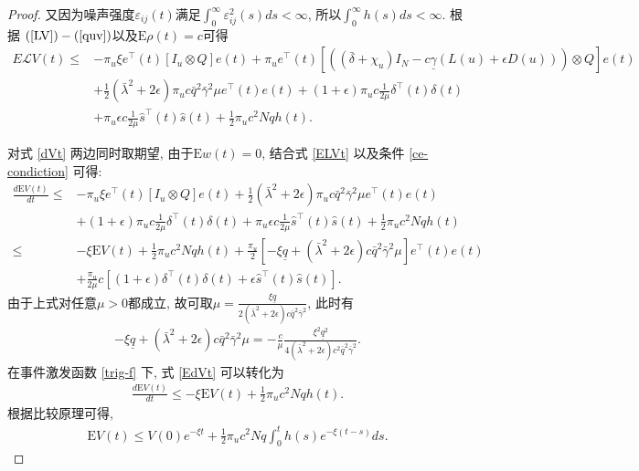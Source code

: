 \begin{proof}
        又因为噪声强度$\varepsilon_{ij}(t)$满足$\int_0^\infty\varepsilon_{ij}^2(s)ds<\infty$, 所以$\int_0^\infty h(s)ds<\infty$.
        根据 $(\ref{LV})-(\ref{quv})$以及$\mathrm{E}\rho(t)=c$可得
        \begin{align}\label{ELVt}
        \nonumber E\mathcal{L}V(t)\leq&-\pi_u\xi e^\top(t)[I_u\otimes Q]e(t)+\pi_ue^\top(t)[((\bar{\delta}+\chi_u)I_N-c\underline{\gamma}(L(u)+\epsilon D(u)))\otimes Q]e(t)\\
        \nonumber&+\frac{1}{2}(\bar{\lambda}^2+2\epsilon)\pi_uc\bar{q}^2\bar{\gamma}^2\mu e^\top(t)e(t)
        +(1+\epsilon)\pi_uc\frac{1}{2\mu}\delta^\top(t)\delta(t)\\
        &+\pi_u\epsilon c\frac{1}{2\mu}\hat{s}^\top(t)\hat{s}(t)+\frac{1}{2}\pi_uc^2Nqh(t).
        \end{align}

        对式 \eqref{dVt} 两边同时取期望, 由于$\mathrm{E}w(t)=0$, 结合式 \eqref{ELVt} 以及条件 \eqref{ce-condiction} 可得:
        \begin{align}\label{EdVt}
        \nonumber \frac{d\mathrm{E}V(t)}{dt}\leq&-\pi_u\xi e^\top(t)[I_u\otimes Q]e(t)+\frac{1}{2}(\bar{\lambda}^2+2\epsilon)\pi_uc\bar{q}^2\bar{\gamma}^2\mu e^\top(t)e(t)\\
        \nonumber&+(1+\epsilon)\pi_uc\frac{1}{2\mu}\delta^\top(t)\delta(t)+\pi_u\epsilon c\frac{1}{2\mu}\hat{s}^\top(t)\hat{s}(t)+\frac{1}{2}\pi_uc^2Nqh(t)\\
        \nonumber\leq&-\xi \mathrm{E}V(t)+\frac{1}{2}\pi_uc^2Nqh(t)+\frac{\pi_u}{2}[-\xi\underline{q}+(\bar{\lambda}^2
        +2\epsilon)c\bar{q}^2\bar{\gamma}^2\mu]e^\top(t)e(t)\\
        &+\frac{\pi_u}{2\mu}c[(1+\epsilon)\delta^\top(t)\delta(t)+\epsilon\hat{s}^\top(t)\hat{s}(t)].
        \end{align}
        由于上式对任意$\mu>0$都成立, 故可取$\mu=\frac{\xi\underline{q}}{2(\bar{\lambda}^2+2\epsilon)c\bar{q}^2\bar{\gamma}^2}$, 此时有
        \begin{align*}
        -\xi\underline{q}+(\bar{\lambda}^2+2\epsilon)c\bar{q}^2\bar{\gamma}^2\mu
        =-\frac{c}{\mu}\frac{\xi^2\underline{q}^2}{4(\bar{\lambda}^2+2\epsilon)c^2\bar{q}^2\bar{\gamma}^2}.
        \end{align*}
        在事件激发函数 \eqref{trig-f} 下, 式 \eqref{EdVt} 可以转化为
        \begin{align*}
        \frac{d\mathrm{E}V(t)}{dt}\leq-\xi \mathrm{E}V(t)+\frac{1}{2}\pi_uc^2Nqh(t).
        \end{align*}
        根据比较原理可得,
        \begin{align*}
        \mathrm{E}V(t)\leq V(0)e^{-\xi t}+\frac{1}{2}\pi_uc^2Nq\int_0^th(s)e^{-\xi(t-s)}ds.
        \end{align*}


\end{proof}

